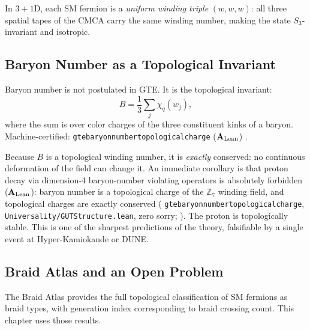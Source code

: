 \documentclass[11pt,openany]{book}
\theoremstyle{remark}
\newcommand{\lean}[1]{%
  \penalty-100
  \begingroup\def\_{\textunderscore\allowbreak}\texttt{#1}\endgroup}
\newcommand{\CatAL}{\ensuremath{\textbf{A}_{\rm Lean}}}
\begin{document}
In $3+1$D, each SM fermion is a \emph{uniform winding triple} $(w,w,w)$: all three
spatial tapes of the CMCA carry the same winding number, making the state
$S_3$-invariant and isotropic.

\subsection*{Baryon Number as a Topological Invariant}

Baryon number is not postulated in GTE.  It is the topological invariant:
\begin{equation}
  B = \frac{1}{3}\sum_{j} \chi_q(w_j),
  \label{eq:baryon_number}
\end{equation}
where the sum is over color charges of the three constituent kinks of a baryon.
Machine-certified: \lean{gte\_baryon\_number\_topological\_charge} (\CatAL)
\cite{SpivackGTEPolynomialUFT}.

Because $B$ is a topological winding number, it is \emph{exactly} conserved:
no continuous deformation of the field can change it.  An immediate corollary
is that proton decay via dimension-4 baryon-number violating operators is
absolutely forbidden (\CatAL): baryon number is a topological charge of the $\mathbb{Z}_7$ winding field,
and topological charges are exactly conserved (\lean{gte\_baryon\_number\_topological\_charge},
\texttt{Universality/GUTStructure.lean}, zero sorry; \cite{SpivackGTEPolynomialUFT}).
The proton is topologically stable.
This is one of the sharpest predictions of the theory, falsifiable by a
single event at Hyper-Kamiokande or DUNE.

\subsection*{Braid Atlas and an Open Problem}

The Braid Atlas \cite{SpivackBraidAtlas} provides the full topological classification
of SM fermions as braid types, with generation index corresponding to braid crossing
count.  This chapter uses those results.
\end{document}
